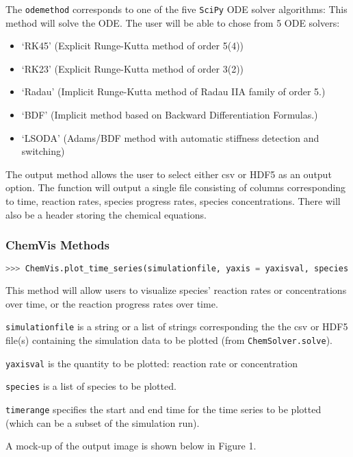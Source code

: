 \documentclass[12pt]{article}
\begin{document}
The \texttt{odemethod} corresponds to one of the five \texttt{SciPy} ODE solver algorithms: 
This method will solve the ODE. The user will be able to chose from 5 ODE solvers: 
\begin{itemize}
\item ‘RK45’ (Explicit Runge-Kutta method of order 5(4))
\item ‘RK23’ (Explicit Runge-Kutta method of order 3(2))
\item ‘Radau’ (Implicit Runge-Kutta method of Radau IIA family of order 5.)
\item ‘BDF’ (Implicit method based on Backward Differentiation Formulas.)
\item ‘LSODA’ (Adams/BDF method with automatic stiffness detection and switching)
\end{itemize}

The output method allows the user to select either csv or HDF5 as an output option. The function will output a single file consisting of columns corresponding to time, reaction rates, species progress rates, species concentrations. There will also be a header storing the chemical equations. 


\subsubsection*{ChemVis Methods}

\begin{lstlisting}[language = Python, basicstyle = \ttfamily, breaklines = True, columns = fullflexible]
>>> ChemVis.plot_time_series(simulationfile, yaxis = yaxisval, species = [list of species], timerange = timerange)
\end{lstlisting}


This method will allow users to visualize species’ reaction rates or concentrations over time, or the reaction progress rates over time. 

\texttt{simulationfile} is a string or a list of strings corresponding the the csv or HDF5 file(s) containing the simulation data to be plotted (from \texttt{ChemSolver.solve}).

\texttt{yaxisval} is the quantity to be plotted: reaction rate or concentration

\texttt{species} is a list of species to be plotted.

\texttt{timerange} specifies the start and end time for the time series to be plotted (which can be a subset of the simulation run). 

A mock-up of the output image is shown below in Figure 1.
\end{document}
